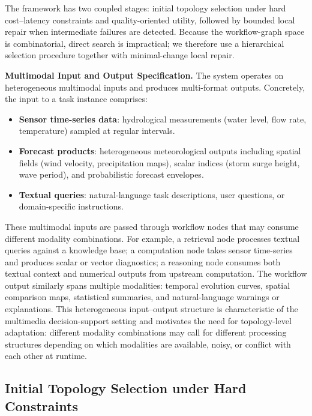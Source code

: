 \documentclass[manuscript,review,anonymous]{acmart}
\begin{document}
The framework has two coupled stages: initial topology selection under hard cost--latency constraints and quality-oriented utility, followed by bounded local repair when intermediate failures are detected. Because the workflow-graph space is combinatorial, direct search is impractical; we therefore use a hierarchical selection procedure together with minimal-change local repair.

\medskip
\noindent\textbf{Multimodal Input and Output Specification.}
The system operates on heterogeneous multimodal inputs and produces multi-format outputs. Concretely, the input to a task instance comprises:

\begin{itemize}
    \item \textbf{Sensor time-series data}: hydrological measurements (water level, flow rate, temperature) sampled at regular intervals.
    \item \textbf{Forecast products}: heterogeneous meteorological outputs including spatial fields (wind velocity, precipitation maps), scalar indices (storm surge height, wave period), and probabilistic forecast envelopes.
    \item \textbf{Textual queries}: natural-language task descriptions, user questions, or domain-specific instructions.
\end{itemize}

These multimodal inputs are passed through workflow nodes that may consume different modality combinations. For example, a retrieval node processes textual queries against a knowledge base; a computation node takes sensor time-series and produces scalar or vector diagnostics; a reasoning node consumes both textual context and numerical outputs from upstream computation. The workflow output similarly spans multiple modalities: temporal evolution curves, spatial comparison maps, statistical summaries, and natural-language warnings or explanations. This heterogeneous input--output structure is characteristic of the multimedia decision-support setting and motivates the need for topology-level adaptation: different modality combinations may call for different processing structures depending on which modalities are available, noisy, or conflict with each other at runtime.

\subsection{Initial Topology Selection under Hard Constraints}
\label{sec:init_objective}
\end{document}

